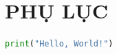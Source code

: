 \section*{PHỤ LỤC}
\setcounter{section}{1}
\setcounter{subsection}{0}

\begin{lstlisting}[language=Python, caption={Source code Python}, label={lst:python}]
print("Hello, World!")
\end{lstlisting}
